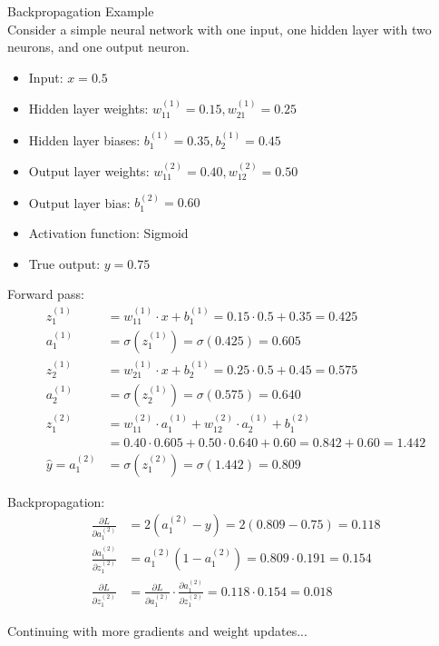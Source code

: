 \begin{example2}{Backpropagation Example}\\
Consider a simple neural network with one input, one hidden layer with two neurons, and one output neuron.
\begin{itemize}
    \item Input: $x = 0.5$
    \item Hidden layer weights: $w^{(1)}_{11} = 0.15, w^{(1)}_{21} = 0.25$
    \item Hidden layer biases: $b^{(1)}_1 = 0.35, b^{(1)}_2 = 0.45$
    \item Output layer weights: $w^{(2)}_{11} = 0.40, w^{(2)}_{12} = 0.50$
    \item Output layer bias: $b^{(2)}_1 = 0.60$
    \item Activation function: Sigmoid
    \item True output: $y = 0.75$
\end{itemize}
\tcblower
Forward pass:
\begin{align*}
z^{(1)}_1 &= w^{(1)}_{11} \cdot x + b^{(1)}_1 = 0.15 \cdot 0.5 + 0.35 = 0.425\\
a^{(1)}_1 &= \sigma(z^{(1)}_1) = \sigma(0.425) = 0.605\\
z^{(1)}_2 &= w^{(1)}_{21} \cdot x + b^{(1)}_2 = 0.25 \cdot 0.5 + 0.45 = 0.575\\
a^{(1)}_2 &= \sigma(z^{(1)}_2) = \sigma(0.575) = 0.640\\
z^{(2)}_1 &= w^{(2)}_{11} \cdot a^{(1)}_1 + w^{(2)}_{12} \cdot a^{(1)}_2 + b^{(2)}_1\\
&= 0.40 \cdot 0.605 + 0.50 \cdot 0.640 + 0.60 = 0.842 + 0.60 = 1.442\\
\hat{y} = a^{(2)}_1 &= \sigma(z^{(2)}_1) = \sigma(1.442) = 0.809
\end{align*}

Backpropagation:
\begin{align*}
\frac{\partial L}{\partial a^{(2)}_1} &= 2(a^{(2)}_1 - y) = 2(0.809 - 0.75) = 0.118\\
\frac{\partial a^{(2)}_1}{\partial z^{(2)}_1} &= a^{(2)}_1(1 - a^{(2)}_1) = 0.809 \cdot 0.191 = 0.154\\
\frac{\partial L}{\partial z^{(2)}_1} &= \frac{\partial L}{\partial a^{(2)}_1} \cdot \frac{\partial a^{(2)}_1}{\partial z^{(2)}_1} = 0.118 \cdot 0.154 = 0.018
\end{align*}

Continuing with more gradients and weight updates...
\end{example2}

